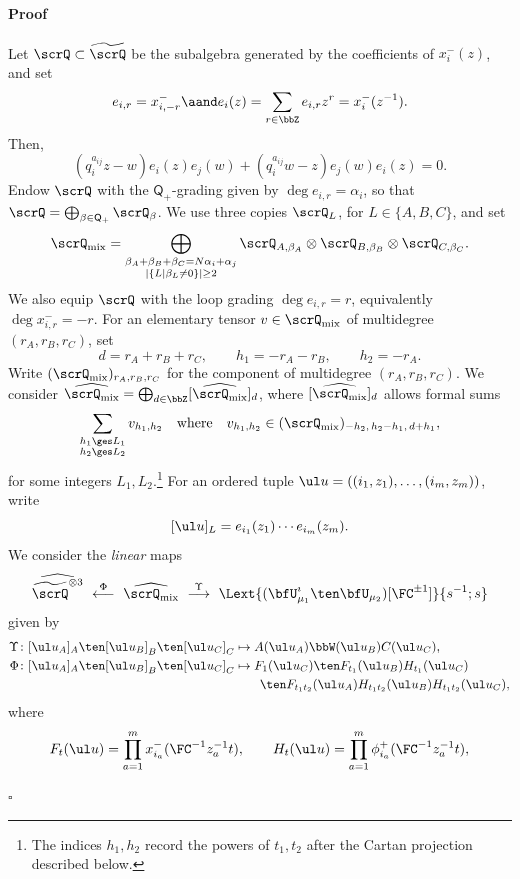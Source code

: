 \documentclass[reqno]{amsart}
\numberwithin{equation}{section}
\newenvironment{pf}{\medskip\paragraph{{\sc Proof}}}{\hfill$\square$\par\medskip}
\begin{document}
\begin{pf}
Let $\scrQ\subset\widetilde{\scrQ}$ be the subalgebra generated by the coefficients of 
$x^-_i(z)$, and set
\[
e_{i,r}=x^-_{i,-r}
\aand
e_i(z)=\sum_{r\in\bbZ}e_{i,r}z^r=x_i^-(z^{-1}).
\]
Then,
\[
(q_i^{a_{ij}}z-w)e_i(z)e_j(w)
+(q_i^{a_{ij}}w-z)e_j(w)e_i(z)=0.
\]
Endow $\scrQ$ with the $\mathsf Q_+$-grading given by
$\deg e_{i,r}=\alpha_i$, so that
$\scrQ=\bigoplus_{\beta\in\mathsf Q_+}\scrQ_\beta$.
We use three copies $\scrQ_L$, for $L\in\{A,B,C\}$, and
set 
\[
\scrQ_{\operatorname{mix}} = \bigoplus_{\substack{\beta_A + \beta_B + \beta_C = N\alpha_i + \alpha_j\\ |\{L \mid \beta_L \neq 0\}| \geq 2}} \scrQ_{A, \beta_A} \otimes \scrQ_{B, \beta_B} \otimes \scrQ_{C, \beta_C}.  
\]
We also equip $\scrQ$ with the loop grading $\deg e_{i,r}=r$,
equivalently $\deg x^-_{i,r}=-r$.
For an elementary tensor $v\in\scrQ_{\operatorname{mix}}$ of multidegree $(r_A,r_B,r_C)$, set
\[
d=r_A+r_B+r_C,\qquad h_1=-r_A-r_B,\qquad h_2=-r_A.
\]
Write $(\scrQ_{\operatorname{mix}})_{r_A,r_B,r_C}$ for the component of multidegree $(r_A,r_B,r_C)$. 
We consider $\widehat{\scrQ_{\operatorname{mix}}}=\bigoplus_{d\in\bbZ}[\widehat{\scrQ_{\operatorname{mix}}}]_d$,
where $[\widehat{\scrQ_{\operatorname{mix}}}]_d$
allows formal sums
\[
\sum_{\substack{h_1\ges L_1\\h_2\ges L_2}}v_{h_1,h_2}
\quad\mbox{where}\quad
v_{h_1,h_2}\in
(\scrQ_{\operatorname{mix}})_{-h_2,\,h_2-h_1,\,d+h_1},
\]
for some integers $L_1,L_2$.\footnote{The indices $h_1,h_2$
record the powers of $t_1,t_2$ after the Cartan projection described below.}
For an ordered tuple
$\ul u=((i_1,z_1),\ldots,(i_m,z_m))$, write
\[
[\ul u]_L=e_{i_1}(z_1)\cdots e_{i_m}(z_m).
\]
We consider the \emph{linear} maps
\[
\widehat{\widetilde{\scrQ}^{\otimes 3}} \ \overset{\Phi}{\longleftarrow} \ \widehat{\scrQ_{\operatorname{mix}}} \ \overset{\Upsilon}{\longrightarrow} \ \Lext{(\bfU^\imath_{\mu_1}\ten\bfU_{\mu_2})[\FC^{\pm1}]}{s^{-1};s}
\]
given by 
\begin{align}
	\Upsilon\colon [\ul u_A]_A\ten[\ul u_B]_B\ten[\ul u_C]_C
	&\mapsto A(\ul u_A)\bbW(\ul u_B)C(\ul u_C),\\
	\Phi\colon [\ul u_A]_A\ten[\ul u_B]_B\ten[\ul u_C]_C
	&\mapsto F_1(\ul u_C)\ten F_{t_1}(\ul u_B)H_{t_1}(\ul u_C)\notag\\
	&\qquad\ten F_{t_1t_2}(\ul u_A)
	H_{t_1t_2}(\ul u_B)H_{t_1t_2}(\ul u_C),
\end{align}
where 
\[
F_t({\ul u}) =\prod_{a=1}^m x_{i_a}^-({\FC^{-1}z_a^{-1}} t), \qquad 
H_t({\ul u}) =\prod_{a=1}^m\phi_{i_a}^+({\FC^{-1}z_a^{-1}} t), 
\]

\end{pf}
\end{document}
